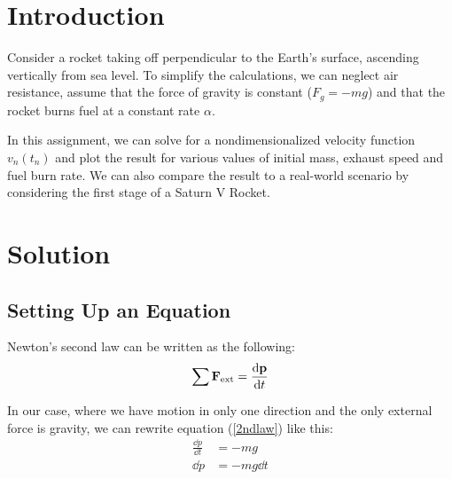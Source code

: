 \documentclass{article}
\begin{document}
\insertTitle

\section{Introduction}

Consider a rocket taking off perpendicular to the Earth's surface, ascending vertically from sea level. To simplify the calculations, we can neglect air resistance, assume that the force of gravity is constant ($F_g = -mg$) and that the rocket burns fuel at a constant rate $\alpha$.

In this assignment, we can solve for a nondimensionalized velocity function $v_n(t_n)$ and plot the result for various values of initial mass, exhaust speed and fuel burn rate. We can also compare the result to a real-world scenario by considering the first stage of a Saturn V Rocket.

\section{Solution}

\subsection{Setting Up an Equation}
Newton's second law can be written as the following:
\begin{equation}\label{2ndlaw}
\sum \vb{F}_{\text{ext}} = \frac{\dd\vb{p}}{\dd{t}}
\end{equation}

In our case, where we have motion in only one direction and the only external force is gravity, we can rewrite equation (\ref{2ndlaw}) like this:
\begin{equation*}
\begin{aligned}
\frac{\dd{p}}{\dd{t}} &= -mg \\
\dd{p} &= -mg\dd{t}
\end{aligned}
\end{equation*}
\end{document}
